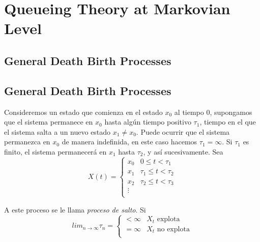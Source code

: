 \section{Queueing Theory at Markovian Level}


\subsection{General Death Birth Processes}




\subsection{General Death Birth Processes}


Consideremos un estado que comienza en el estado $x_{0}$ al tiempo
$0$, supongamos que el sistema permanece en $x_{0}$ hasta alg\'un
tiempo positivo $\tau_{1}$, tiempo en el que el sistema salta a un
nuevo estado $x_{1}\neq x_{0}$. Puede ocurrir que el sistema
permanezca en $x_{0}$ de manera indefinida, en este caso hacemos
$\tau_{1}=\infty$. Si $\tau_{1}$ es finito, el sistema
permanecer\'a en $x_{1}$ hasta $\tau_{2}$, y as\'i sucesivamente.
Sea
\begin{equation}
X\left(t\right)=\left\{\begin{array}{cc}
x_{0} & 0\leq t<\tau_{1}\\
x_{1} & \tau_{1}\leq t<\tau_{2}\\
x_{2} & \tau_{2}\leq t<\tau_{3}\\
\vdots &\\
\end{array}\right.
\end{equation}

A este proceso  se le llama {\em proceso de salto}. Si
\begin{equation}
lim_{n\rightarrow\infty}\tau_{n}=\left\{\begin{array}{cc}
<\infty & X_{t}\textrm{ explota}\\
=\infty & X_{t}\textrm{ no explota}\\
\end{array}\right.
\end{equation}

